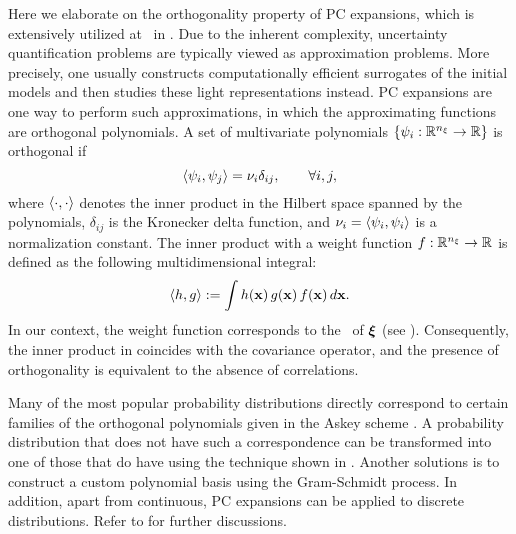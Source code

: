 Here we elaborate on the orthogonality property \cite{xiu2010} of PC expansions, which is extensively utilized at \ in .
Due to the inherent complexity, uncertainty quantification problems are typically viewed as approximation problems.
More precisely, one usually constructs computationally efficient surrogates of the initial models and then studies these light representations instead.
PC expansions \cite{xiu2010} are one way to perform such approximations, in which the approximating functions are orthogonal polynomials.
A set of multivariate polynomials $\{ \psi_i: \mathbb{R}^{n_\xi} \to \mathbb{R} \}$ is orthogonal if
\begin{equation} \elabel{orthogonality}
  \oInner{\pcb_i}{\pcb_j} = \pcn_i \delta_{ij}, \qquad \forall i, j,
\end{equation}
where $\oInner{\cdot}{\cdot}$ denotes the inner product in the Hilbert space spanned by the polynomials, $\delta_{ij}$ is the Kronecker delta function, and $\pcn_i = \oInner{\pcb_i}{\pcb_i}$ is a normalization constant.
The inner product with a weight function $f: \mathbb{R}^{n_\xi} \to \mathbb{R}$ is defined as the following multidimensional integral:
\begin{equation} \elabel{inner-product}
  \oInner{h}{g} := \int h(\vX) \, g(\vX) \, \fPDF(\vX) \, d\vX.
\end{equation}
In our context, the weight function corresponds to the \pdf\ of $\boldsymbol{\xi}$ (see ).
Consequently, the inner product in  coincides with the covariance operator, and the presence of orthogonality is equivalent to the absence of correlations.

Many of the most popular probability distributions directly correspond to certain families of the orthogonal polynomials given in the Askey scheme \cite{xiu2010}.
A probability distribution that does not have such a correspondence can be transformed into one of those that do have using the technique shown in .
Another solutions is to construct a custom polynomial basis using the Gram-Schmidt process.
In addition, apart from continuous, PC expansions can be applied to discrete distributions.
Refer to \cite{xiu2010} for further discussions.
